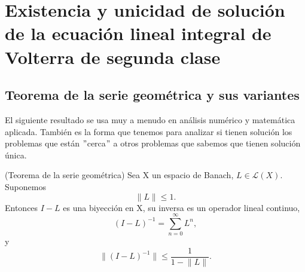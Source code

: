 \chapter{Existencia y unicidad de solución de la ecuación lineal integral de Volterra de segunda clase}
\section{Teorema de la serie geométrica y sus variantes}
El siguiente resultado se usa muy a menudo en análisis numérico y matemática aplicada. También es la forma que tenemos para analizar si tienen solución los problemas que están $"$cerca$"$ a otros problemas que sabemos que tienen solución única.
\begin{teorema}
	(Teorema de la serie geométrica) Sea X un espacio de Banach, $L \in \mathcal{L}(X)$. Suponemos
	\begin{equation}
		\lVert L \rVert \leq 1.
	\end{equation}
	Entonces $I - L$ es una biyección en X, su inversa es un operador lineal continuo,
	\begin{equation}
		(I-L)^{-1} = \sum_{n=0}^{\infty}L^n,
	\end{equation}
	y
	\begin{equation}\label{eq:teo1}
		\lVert (I-L)^{-1} \rVert \leqslant \dfrac{1}{1 - \lVert L \rVert}.
	\end{equation}
\end{teorema}
